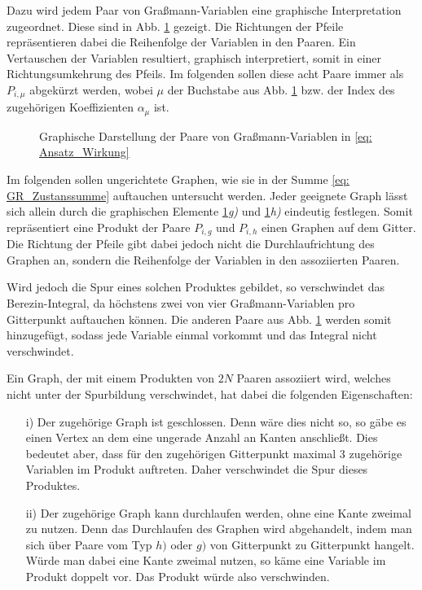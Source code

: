 \noindent Dazu wird jedem Paar von Graßmann-Variablen eine graphische Interpretation zugeordnet. Diese sind in Abb. \ref{Abb: Graphische Interpretation Graßmann Paare} gezeigt. Die Richtungen der Pfeile repräsentieren dabei die Reihenfolge der Variablen in den Paaren. Ein Vertauschen der Variablen resultiert, graphisch interpretiert, somit in einer Richtungsumkehrung des Pfeils. Im folgenden sollen diese acht Paare immer als $P_{i, \mu}$ abgekürzt werden, wobei $\mu$ der Buchstabe aus Abb. \ref{Abb: Graphische Interpretation Graßmann Paare} bzw. der Index des zugehörigen Koeffizienten $\alpha_{\mu}$ ist.

\begin{figure}[h!]
    \centering
    
    \caption{Graphische Darstellung der Paare von Graßmann-Variablen in \eqref{eq: Ansatz_Wirkung} }
    \label{Abb: Graphische Interpretation Graßmann Paare}
\end{figure}

\noindent Im folgenden sollen ungerichtete Graphen, wie sie in der Summe \eqref{eq: GR_Zustanssumme} auftauchen untersucht werden. Jeder geeignete Graph lässt sich allein durch die graphischen Elemente \ref{Abb: Graphische Interpretation Graßmann Paare}\textit{g)} und \ref{Abb: Graphische Interpretation Graßmann Paare}\textit{h)} eindeutig festlegen. Somit repräsentiert eine Produkt der Paare $P_{i,g}$ und $P_{i,h}$ einen Graphen auf dem Gitter. Die Richtung der Pfeile gibt dabei jedoch nicht die Durchlaufrichtung des Graphen an, sondern die Reihenfolge der Variablen in den assoziierten Paaren. 

\noindent Wird jedoch die Spur eines solchen Produktes gebildet, so verschwindet das Berezin-Integral, da höchstens zwei von vier Graßmann-Variablen pro Gitterpunkt auftauchen können. Die anderen Paare aus Abb. \ref{Abb: Graphische Interpretation Graßmann Paare} werden somit hinzugefügt, sodass jede Variable einmal vorkommt und das Integral nicht verschwindet. 

\noindent Ein Graph, der mit einem Produkten von $2N$ Paaren assoziiert wird, welches nicht unter der Spurbildung verschwindet, hat dabei die folgenden Eigenschaften:
\begin{itemize}
\item[i)] Der zugehörige Graph ist geschlossen. Denn wäre dies nicht so, so gäbe es einen Vertex an dem eine ungerade Anzahl an Kanten anschließt. Dies bedeutet aber, dass für den zugehörigen Gitterpunkt maximal 3 zugehörige Variablen im Produkt auftreten. Daher verschwindet die Spur dieses Produktes.
\item[ii)] Der zugehörige Graph kann durchlaufen werden, ohne eine Kante zweimal zu nutzen. Denn das Durchlaufen des Graphen wird abgehandelt, indem man sich über Paare vom Typ $h)$ oder $g)$ von Gitterpunkt zu Gitterpunkt hangelt. Würde man dabei eine Kante zweimal nutzen, so käme eine Variable im Produkt doppelt vor. Das Produkt würde also verschwinden. 
\end{itemize}

